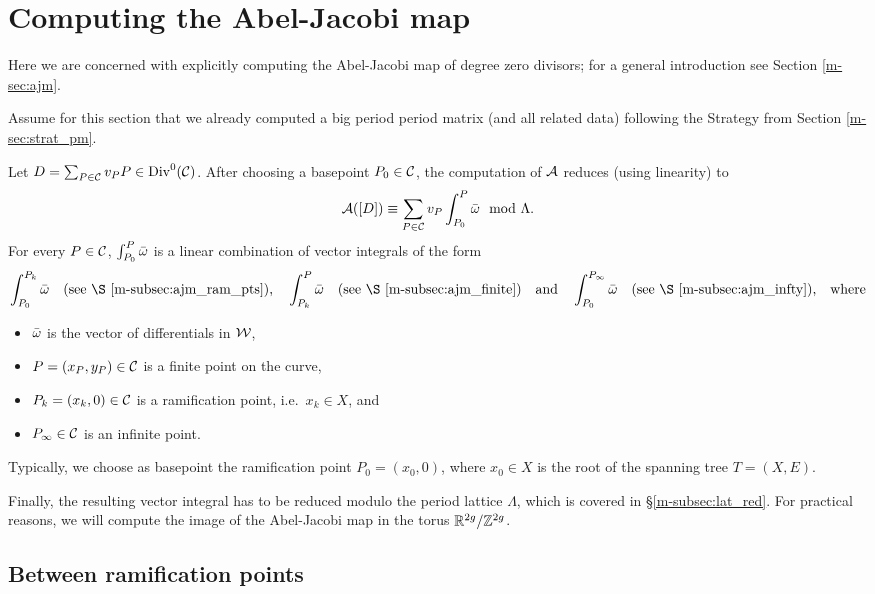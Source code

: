 \documentclass[main.tex]{subfiles}
\begin{document}
  \section{Computing the Abel-Jacobi map}\label{sec:comp_ajm}
  
   Here we are concerned with explicitly computing the Abel-Jacobi map of degree zero divisors; for a general introduction see Section \ref{m-sec:ajm}.
   
   Assume for this section that we already computed a big period period matrix (and all related data) following the Strategy from Section \ref{m-sec:strat_pm}. 
   
   Let $D = \sum_{P \in \mathcal{C}} v_P P \in \operatorname{Div}^0(\mathcal{C})$. After choosing a basepoint $P_0 \in \mathcal{C}$, the computation of $\mathcal{A}$ reduces (using linearity) to
   \begin{equation}
     \mathcal{A}([D]) \equiv \sum_{P \in \mathcal{C}} v_P \int_{P_0}^P \bar{\omega} \mod \Lambda.
   \end{equation}
  For every $P \in \mathcal{C}$, $\int_{P_0}^P \bar{\omega}$ is a linear combination of vector integrals of the form
  \begin{align*}
    \int_{P_0}^{P_k} \bar\w\quad \text{(see \S \ref{m-subsec:ajm_ram_pts}),} \quad
    \int_{P_k}^{P} \bar\w \quad \text{(see \S \ref{m-subsec:ajm_finite})}
    \quad \text{and} \quad \int_{P_0}^{P_{\infty}} \bar\w\quad \text{(see \S \ref{m-subsec:ajm_infty}),} \quad \text{where}
  \end{align*}
  \begin{itemize}
   \item $\bar{\omega}$ is the vector of differentials in $\mathcal{W}$,
   \item $P = (x_P,y_P) \in \mathcal{C}$ is a finite point on the curve,
   \item $P_k = (x_k,0) \in \mathcal{C}$ is a ramification point, i.e.\ $x_k \in X$, and
   \item $P_{\infty} \in \mathcal{C}$ is an infinite point.
  \end{itemize}
  
   Typically, we choose as basepoint the ramification point $P_0 = (x_0,0)$, where $x_0 \in X$ is the root of the spanning tree $T = (X,E)$.
   
  Finally, the resulting vector integral has to be reduced modulo the period lattice $\Lambda$, which is covered in \S \ref{m-subsec:lat_red}. For practical reasons, we will compute the
  image of the Abel-Jacobi map in the torus $\mathbb{R}^{2g} / \mathbb{Z}^{2g}$.
  
  
  \subsection{Between ramification points}\label{subsec:ajm_ram_pts}
\end{document}
